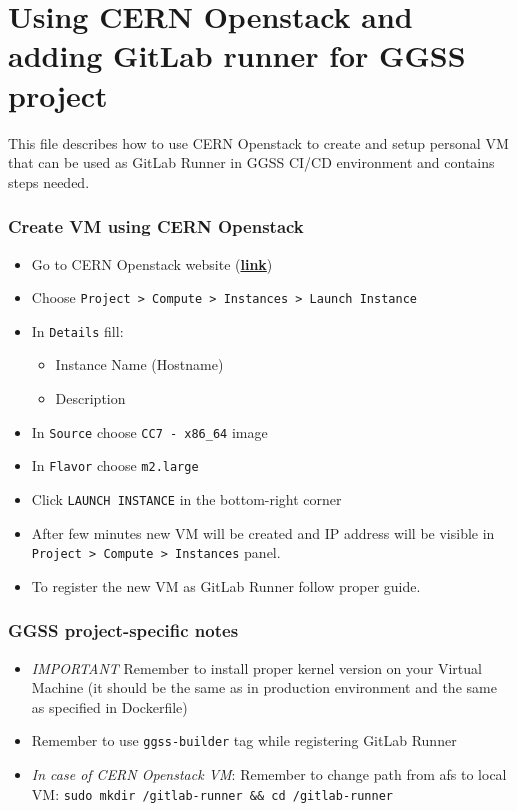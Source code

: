 \clearpage
\section{Using CERN Openstack and adding GitLab runner for GGSS project}
This file describes how to use CERN Openstack to create and setup personal VM that can be used as GitLab Runner in GGSS CI/CD environment and contains steps needed.

\subsubsection*{Create VM using CERN Openstack}
\begin{itemize}
    \item Go to CERN Openstack website (\href{https://openstack.cern.ch/}{\textbf{link}})
    \item Choose \lstinline{Project > Compute > Instances > Launch Instance}
    \item In \lstinline{Details} fill: \begin{itemize}
        \item Instance Name (Hostname)
        \item Description
    \end{itemize}
    \item In \lstinline{Source} choose \lstinline{CC7 - x86_64} image
    \item In \lstinline{Flavor} choose \lstinline{m2.large}
    \item Click \lstinline{LAUNCH INSTANCE} in the bottom-right corner
    \item After few minutes new VM will be created and IP address will be visible in \lstinline{Project > Compute > Instances} panel.
    \item To register the new VM as GitLab Runner follow proper guide.
\end{itemize}

\subsubsection*{GGSS project-specific notes}
\begin{itemize}
    \item \textit{IMPORTANT} Remember to install proper kernel version on your Virtual Machine (it should be the same as in production environment and the same as specified in Dockerfile)
    \item Remember to use \lstinline{ggss-builder} tag while registering GitLab Runner
    \item \textit{In case of CERN Openstack VM}: Remember to change path from afs to local VM: \lstinline{sudo mkdir /gitlab-runner && cd /gitlab-runner}
\end{itemize}

